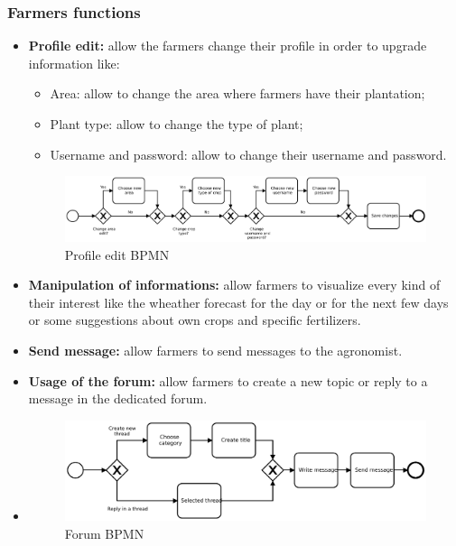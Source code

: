 \documentclass[table, 12pt]{article}
\begin{document}
\subsubsection{Farmers functions}
\begin{itemize}
    \item \textbf{Profile edit: }allow the farmers change their profile in order to upgrade information like: 
    \begin{itemize}
        \item[] Area: allow to change the area where farmers have their plantation;
        \item[] Plant type: allow to change the type of plant;
        \item[] Username and password: allow to change their username and password.
    \end{itemize}
    \begin{center}
        \begin{figure}[!h]
            \includegraphics[width=\textwidth]{assets/ProfileEditBpmn}
            \caption{Profile edit BPMN}
            \label{fig: profileedit}
        \end{figure}
    \end{center}
    \item \textbf{Manipulation of informations: }allow farmers to visualize every kind of their interest like the wheather forecast for the day or for the next few days or some suggestions about own crops and specific fertilizers.
    \item \textbf{Send message: }allow farmers to send messages to the agronomist.
    \item \textbf{Usage of the forum: }allow farmers to create a new topic or reply to a message in the dedicated forum.
    \item \begin{center}
        \begin{figure}[!h]
            \includegraphics[width=\textwidth]{assets/ForumBpmn}
            \caption{Forum BPMN}
            \label{fig: forum}
        \end{figure}
    \end{center}
\end{itemize}
\end{document}
